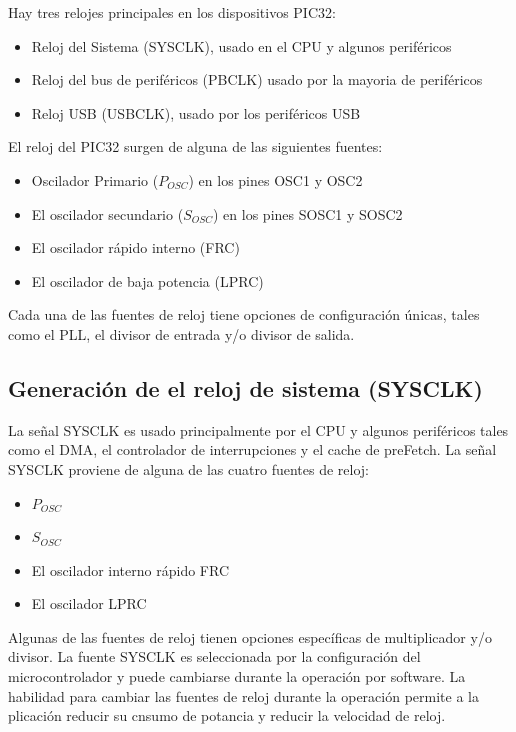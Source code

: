 \documentclass[12pt,letterpaper,twoside]{book}
\begin{document}
Hay tres relojes principales en los dispositivos PIC32:

\begin{itemize}
\item Reloj del Sistema (SYSCLK), usado en el CPU y algunos periféricos
\item Reloj del bus de periféricos (PBCLK) usado por la mayoria de periféricos
\item Reloj USB (USBCLK), usado por los periféricos USB
\end{itemize}

El reloj del PIC32 surgen de alguna de las siguientes fuentes:

\begin{itemize}
\item Oscilador Primario ($P_{OSC}$) en los pines OSC1 y OSC2
\item El oscilador secundario ($S_{OSC}$) en los pines SOSC1 y SOSC2
\item El oscilador rápido interno (FRC)
\item El oscilador de baja potencia (LPRC) 
\end{itemize}

Cada una de las fuentes de reloj tiene opciones de  configuración   únicas, tales como el PLL, el divisor de entrada y/o divisor de salida. 

\subsection{Generación de el reloj de sistema (SYSCLK)}

La señal SYSCLK es usado principalmente por el CPU y algunos periféricos tales como el DMA, el controlador de interrupciones y el cache de preFetch. La señal SYSCLK proviene de alguna de las cuatro fuentes de reloj:

\begin{itemize}
\item $P_{OSC}$
\item $S_{OSC}$
\item El oscilador interno rápido FRC
\item El oscilador LPRC
\end{itemize}


Algunas de las fuentes de reloj tienen opciones específicas de multiplicador y/o divisor. La fuente SYSCLK es seleccionada por la configuración del microcontrolador y puede cambiarse durante la operación por software. La habilidad para cambiar las fuentes de reloj durante la operación permite a la plicación reducir su cnsumo de potancia y reducir la velocidad de reloj.
\end{document}
